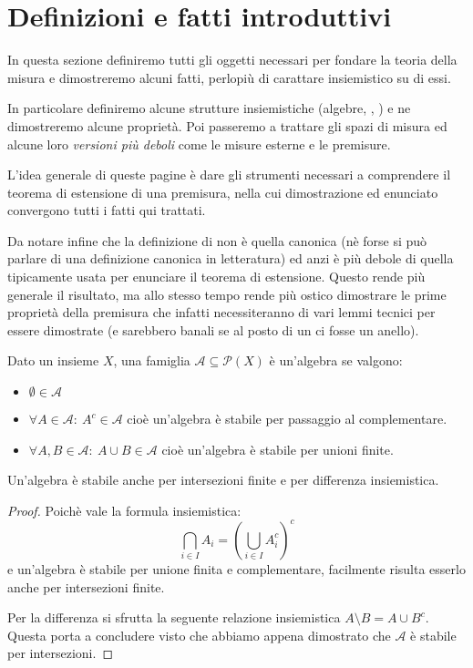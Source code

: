 \section{Definizioni e fatti introduttivi}
In questa sezione definiremo tutti gli oggetti necessari per fondare la teoria della misura e dimostreremo alcuni fatti, perlopiù di carattare insiemistico su di essi.

In particolare definiremo alcune strutture insiemistiche (algebre, \sigalg[e], \semiring[i]) e ne dimostreremo alcune proprietà. Poi passeremo a trattare gli spazi di misura ed alcune loro \emph{versioni più deboli} come le misure esterne e le premisure.

L'idea generale di queste pagine è dare gli strumenti necessari a comprendere il teorema di estensione di una premisura, nella cui dimostrazione ed enunciato convergono tutti i fatti qui trattati. 

Da notare infine che la definizione di \semiring{} non è quella canonica (nè forse si può parlare di una definizione canonica in letteratura) ed anzi è più debole di quella tipicamente usata per enunciare il teorema di estensione. Questo rende più generale il risultato, ma allo stesso tempo rende più ostico dimostrare le prime proprietà della premisura che infatti necessiteranno di vari lemmi tecnici per essere dimostrate (e sarebbero banali se al posto di un \semiring{} ci fosse un anello).

\begin{definition}[Algebra]
	Dato un insieme $X$, una famiglia $\mathcal A\subseteq\mathcal P(X)$ è un'algebra se valgono:
	\begin{itemize}
		\item $\emptyset\in\mathcal A$
		\item $\forall A\in\mathcal A:\ A^c\in\mathcal A$ cioè un'algebra è stabile per passaggio al complementare.
		\item $\forall A,B\in\mathcal A:\ A\cup B\in\mathcal A$ cioè un'algebra è stabile per unioni finite.
	\end{itemize}
\end{definition}
\begin{remark}\label{ProprietaAlg}
	Un'algebra è stabile anche per intersezioni finite e per differenza insiemistica.
\end{remark}
\begin{proof}
	Poichè vale la formula insiemistica:
	\begin{equation*}
		\bigcap_{i\in I} A_i = \left( \bigcup_{i\in I} A_i^c \right)^c
	\end{equation*}
	e un'algebra è stabile per unione finita e complementare, facilmente risulta esserlo anche per intersezioni finite.
	
	Per la differenza si sfrutta la seguente relazione insiemistica $A\setminus B=A\cup B^c$. Questa porta a concludere visto che abbiamo appena dimostrato che $\mathcal A$ è stabile per intersezioni.
\end{proof}


